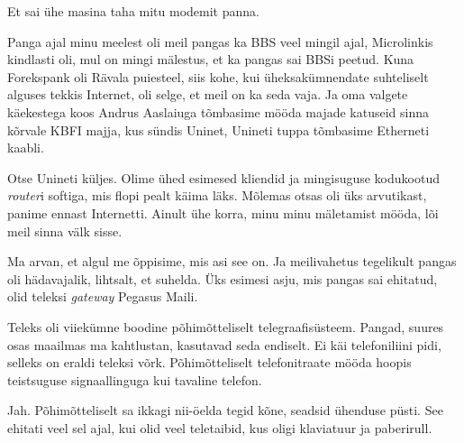 
Et sai ühe masina taha  mitu modemit panna.


Panga ajal minu meelest oli meil pangas ka BBS veel mingil ajal, 
Microlinkis kindlasti oli, mul on mingi mälestus, et ka pangas 
sai BBSi peetud. Kuna Forekspank oli Rävala puiesteel, siis  kohe, kui 
üheksakümnendate suhteliselt alguses tekkis Internet, oli selge, et meil on ka 
seda vaja. Ja oma valgete käekestega koos Andrus Aaslaiuga tõmbasime mööda majade katuseid sinna kõrvale KBFI majja, 
kus sündis Uninet, Unineti tuppa tõmbasime Etherneti kaabli.


Otse Unineti küljes. Olime ühed esimesed kliendid ja mingisuguse kodukootud 
\emph{router}i softiga, mis flopi pealt käima läks. Mõlemas otsas oli üks 
arvutikast, panime ennast Internetti. Ainult ühe korra, minu minu mäletamist 
mööda, lõi meil sinna välk sisse.


Ma arvan, et algul me õppisime, mis asi see on. Ja meilivahetus tegelikult 
pangas oli hädavajalik, lihtsalt, et  suhelda. Üks esimesi asju, mis pangas sai 
ehitatud, olid teleksi \emph{gateway} Pegasus Maili. 


Teleks oli viiekümne boodine 
põhimõtteliselt telegraafisüsteem. Pangad, suures 
osas maailmas ma kahtlustan, kasutavad seda endiselt. Ei käi telefoniliini 
pidi, selleks on eraldi teleksi võrk. Põhimõtteliselt telefonitraate mööda 
hoopis teistsuguse signaallinguga kui tavaline telefon.


Jah. Põhimõtteliselt sa ikkagi  nii-öelda tegid kõne, seadsid ühenduse püsti. 
See ehitati veel sel ajal, kui olid veel  teletaibid, kus oligi klaviatuur ja 
paberirull.



